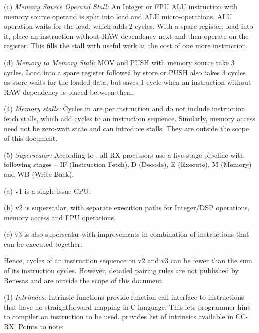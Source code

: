     (c) \emph{Memory Source Operand Stall:} %
    An Integer or FPU ALU instruction with memory source operand is split into load and ALU 
    micro-operations. ALU operation waits for the load, which adds 2 cycles. With a spare register, 
    load into it, place an instruction without RAW dependency next and then operate on the register. 
    This fills the stall with useful work at the cost of one more instruction.

    (d) \emph{Memory to Memory Stall:} %
    MOV and PUSH with memory source take 3 cycles. Load into a spare register followed by store 
    or PUSH also takes 3 cycles, as store waits for the loaded data, but saves 1 cycle when 
    an instruction without RAW dependency is placed between them.

\levelone    
(4) \emph{Memory stalls:} %
Cycles in  are per instruction and do not include instruction 
fetch stalls, which add cycles to an instruction sequence. Similarly, memory access need not be 
zero-wait state and can introduce stalls. They are outside the scope of this document.

(5) \emph{Superscalar:} %
According to \cite{rx_brochure, rxv3_details, rx_ooo}, all RX processors use a five-stage pipeline with following 
stages -- IF (Instruction Fetch), D (Decode), E (Execute), M (Memory) and WB (Write Back).


    \leveltwo
    (a) v1 is a single-issue CPU.

    (b) v2 is superscalar, with separate execution paths for Integer/DSP operations, memory 
    access and FPU operations. 

    (c) v3 is also superscalar with improvements in combination of instructions that can be 
    executed together.

\levelone
Hence, cycles of an instruction sequence on v2 and v3 can be fewer than the sum of its 
instruction cycles. However, detailed pairing rules are not published by Renesas and 
are outside the scope of this document.



\SOPNoteBody

(1) \emph{Intrinsics:} %
Intrinsic functions provide function call interface to instructions that have no straightforward
mapping in C language. This lets programmer hint to compiler on instruction to be used.
 provides list of intrinsics available in CC-RX. Points to note:


